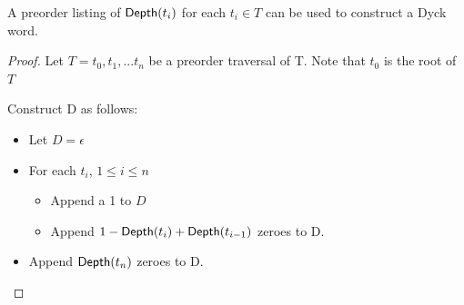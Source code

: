 \begin{remark}A preorder listing of $\mathsf{Depth}{(t_i)} $ for each $ t_i \in T$ can be used to construct a Dyck word. \label{re:construct_dyck}

\end{remark} 
\begin{proof}

    Let $T=t_0,t_1,...t_n$ be a preorder traversal of T.  Note that $t_0$ is the root of $T$

    Construct D as follows: 

    \begin{itemize}
	\item Let $D=\epsilon$ %
	\item For each $t_i$, $1\le i \le n$
	    \begin{itemize}
		\item Append a 1 to $D$
		\item Append $1-\mathsf{Depth}{(t_{i})}+\mathsf{Depth}{(t_{i-1})}$ zeroes to D.
	    \end{itemize}
	\item Append $\mathsf{Depth}{(t_{n})}$ zeroes to D. 
    \end{itemize}
\end{proof} 


